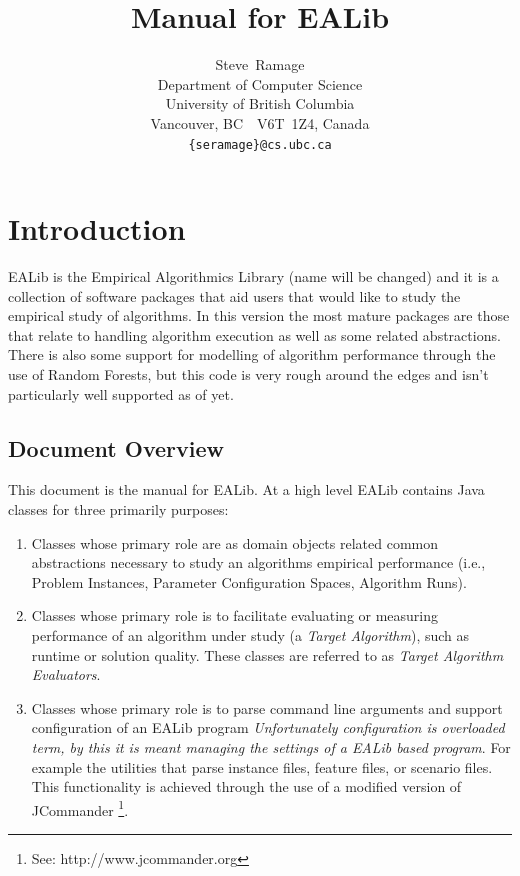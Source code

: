 \documentclass[11pt,letterpaper,oneside]{article}
\begin{document}
\title{Manual for EALib }
\author{
Steve~Ramage\\
Department of Computer Science\\
University of British Columbia\\
Vancouver, BC\ \ V6T~1Z4, Canada\\
\texttt{\{seramage\}@cs.ubc.ca}
}


\maketitle

\tableofcontents

\section{Introduction}

EALib is the Empirical Algorithmics Library (name will be changed) and it is a collection of software packages that aid users that would like to study the empirical study of algorithms. In this version the most mature packages are those that relate to handling algorithm execution as well as some related abstractions. There is also some support for modelling of algorithm performance through the use of Random Forests, but this code is very rough around the edges and isn't particularly well supported as of yet.

\subsection{Document Overview}

This document is the manual for EALib. At a high level EALib contains Java classes for three primarily purposes:

\begin{enumerate}
\item Classes whose primary role are as domain objects related common abstractions necessary to study an algorithms empirical performance (i.e., Problem Instances, Parameter Configuration Spaces, Algorithm Runs).

\item Classes whose primary role is to facilitate evaluating or measuring performance of an algorithm under study (a \textit{Target Algorithm}), such as runtime or solution quality. These classes are referred to as \textit{Target Algorithm Evaluators}. 

\item Classes whose primary role is to parse command line arguments and support configuration of an EALib program \textit{Unfortunately configuration is overloaded term, by this it is meant managing the settings of a EALib based program}. For example the utilities that parse instance files, feature files, or scenario files. This functionality is achieved through the use of a modified version of JCommander \footnote{See: http://www.jcommander.org}. 

\end{enumerate}
\end{document}
